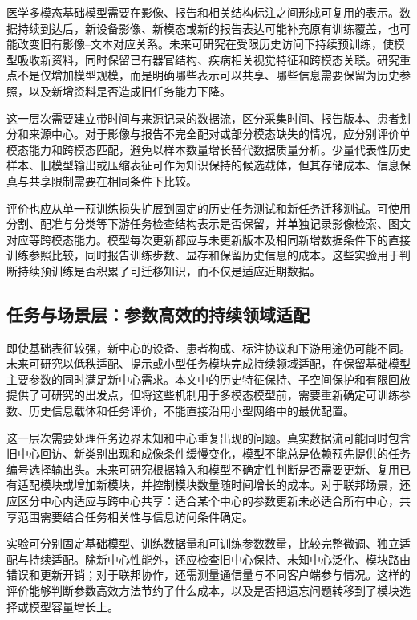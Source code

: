 医学多模态基础模型需要在影像、报告和相关结构标注之间形成可复用的表示。数据持续到达后，新设备影像、新模态或新的报告表达可能补充原有训练覆盖，也可能改变旧有影像--文本对应关系。未来可研究在受限历史访问下持续预训练，使模型吸收新资料，同时保留已有器官结构、疾病相关视觉特征和跨模态关联。研究重点不是仅增加模型规模，而是明确哪些表示可以共享、哪些信息需要保留为历史参照，以及新增资料是否造成旧任务能力下降。

这一层次需要建立带时间与来源记录的数据流，区分采集时间、报告版本、患者划分和来源中心。对于影像与报告不完全配对或部分模态缺失的情况，应分别评价单模态能力和跨模态匹配，避免以样本数量增长替代数据质量分析。少量代表性历史样本、旧模型输出或压缩表征可作为知识保持的候选载体，但其存储成本、信息保真与共享限制需要在相同条件下比较。

评价也应从单一预训练损失扩展到固定的历史任务测试和新任务迁移测试。可使用分割、配准与分类等下游任务检查结构表示是否保留，并单独记录影像检索、图文对应等跨模态能力。模型每次更新都应与未更新版本及相同新增数据条件下的直接训练参照比较，同时报告训练步数、显存和保留历史信息的成本。这些实验用于判断持续预训练是否积累了可迁移知识，而不仅是适应近期数据。

\subsection{任务与场景层：参数高效的持续领域适配}

即使基础表征较强，新中心的设备、患者构成、标注协议和下游用途仍可能不同。未来可研究以低秩适配、提示或小型任务模块完成持续领域适配，在保留基础模型主要参数的同时满足新中心需求。本文中的历史特征保持、子空间保护和有限回放提供了可研究的出发点，但将这些机制用于多模态模型前，需要重新确定可训练参数、历史信息载体和任务评价，不能直接沿用小型网络中的最优配置。

这一层次需要处理任务边界未知和中心重复出现的问题。真实数据流可能同时包含旧中心回访、新类别出现和成像条件缓慢变化，模型不能总是依赖预先提供的任务编号选择输出头。未来可研究根据输入和模型不确定性判断是否需要更新、复用已有适配模块或增加新模块，并控制模块数量随时间增长的成本。对于联邦场景，还应区分中心内适应与跨中心共享：适合某个中心的参数更新未必适合所有中心，共享范围需要结合任务相关性与信息访问条件确定。

实验可分别固定基础模型、训练数据量和可训练参数数量，比较完整微调、独立适配与持续适配。除新中心性能外，还应检查旧中心保持、未知中心泛化、模块路由错误和更新开销；对于联邦协作，还需测量通信量与不同客户端参与情况。这样的评价能够判断参数高效方法节约了什么成本，以及是否把遗忘问题转移到了模块选择或模型容量增长上。

